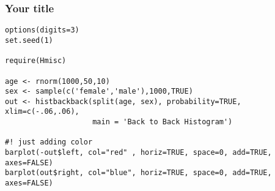 \documentclass[9pt]{beamer}
\begin{document}
\begin{frame}[fragile]
\frametitle{Your title}

\begin{lstlisting}options(digits=3)
set.seed(1)

require(Hmisc)

age <- rnorm(1000,50,10)
sex <- sample(c('female','male'),1000,TRUE)
out <- histbackback(split(age, sex), probability=TRUE, xlim=c(-.06,.06),
                    main = 'Back to Back Histogram')

#! just adding color
barplot(-out$left, col="red" , horiz=TRUE, space=0, add=TRUE, axes=FALSE)
barplot(out$right, col="blue", horiz=TRUE, space=0, add=TRUE, axes=FALSE)
\end{lstlisting}
\end{frame}
\end{document}
